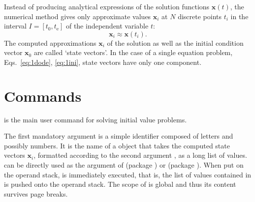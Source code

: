 \documentclass[
  fontsize=11pt,
  english,
  BCOR=10mm,DIV=12,
  bibliography=totoc,
  parskip=false,
  headings=small,
  headinclude=false,
  footinclude=false,
  twoside=false,
  UKenglish
]{pst-doc}
\begin{document}
Instead of producing analytical expressions of the solution functions $\mathbf{x}(t)$, the numerical method gives only approximate values $\mathbf{x}_i$ at $N$ discrete points $t_i$ in the interval $I=[t_0, t_\mathrm{e}]$ of the independent variable $t$:
\begin{equation}
\mathbf{x}_i\approx\mathbf{x}(t_i).
\end{equation}
The computed approximations $\mathbf{x}_i$ of the solution as well as the initial condition vector $\mathbf{x}_0$ are called `state vectors'. In the case of a single equation problem, Eqs.~\eqref{eq:1dode}, \eqref{eq:1ini}, state vectors have only one component.

\section{Commands}
\begin{BDef}
    \OptArgs{}
\end{BDef}
is the main user command for solving initial value problems.

The first mandatory argument  is a simple identifier composed of letters and possibly numbers. It is the name of a \PS{} object that takes the computed state vectors $\mathbf{x}_i$, formatted according to the second argument , as a long list of values.  can be directly used as the  argument of  (package ) or  (package ). When put on the \PS{} operand stack,  is immediately executed, that is, the list of values contained in  is pushed onto the operand stack. The scope of  is global and thus its content survives page breaks.
\end{document}
